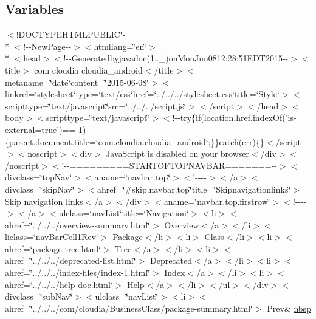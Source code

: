 \subsection*{Variables}
\begin{DoxyCompactItemize}
\item 
$<$!D\-O\-C\-T\-Y\-P\-E\-H\-T\-M\-L\-P\-U\-B\-L\-I\-C\char`\"{}-\/\\*
$<$!-\/-\/New\-Page-\/-\/$>$$<$htmllang=\char`\"{}en\char`\"{}$>$\\*
$<$head$>$$<$!-\/-\/Generatedbyjavadoc(1..\-\_)on\-Mon\-Jun0812\-:28\-:51\-E\-D\-T2015-\/-\/$>$$<$title$>$ com cloudia cloudia\-\_\-android$<$/title$>$$<$metaname=\char`\"{}date\char`\"{}content=\char`\"{}2015-\/06-\/08\char`\"{}$>$$<$linkrel=\char`\"{}stylesheet\char`\"{}type=\char`\"{}text/css\char`\"{}href=\char`\"{}../../../stylesheet.\-css\char`\"{}title=\char`\"{}\-Style\char`\"{}$>$$<$scripttype=\char`\"{}text/javascript\char`\"{}src=\char`\"{}../../../script.\-js\char`\"{}$>$$<$/script$>$$<$/head$>$$<$body$>$$<$scripttype=\char`\"{}text/javascript\char`\"{}$>$$<$!-\/-\/try\{if(location.\-href.\-index\-Of('is-\/external=true')==-\/1)\{parent.\-document.\-title=\char`\"{}com.\-cloudia.\-cloudia\-\_\-android\char`\"{};\}\}catch(err)\{\}$<$/script$>$$<$noscript$>$$<$div$>$ Java\-Script is disabled on your browser$<$/div$>$$<$/noscript$>$$<$!-\/-\/=========\-S\-T\-A\-R\-T\-O\-F\-T\-O\-P\-N\-A\-V\-B\-A\-R=======-\/-\/$>$$<$divclass=\char`\"{}top\-Nav\char`\"{}$>$$<$aname=\char`\"{}navbar.\-top\char`\"{}$>$$<$!-\/-\/-\/-\/$>$$<$/a$>$$<$divclass=\char`\"{}skip\-Nav\char`\"{}$>$$<$ahref=\char`\"{}\#skip.\-navbar.\-top\char`\"{}title=\char`\"{}\-Skipnavigationlinks\char`\"{}$>$ Skip navigation links$<$/a$>$$<$/div$>$$<$aname=\char`\"{}navbar.\-top.\-firstrow\char`\"{}$>$$<$!-\/-\/-\/-\/$>$$<$/a$>$$<$ulclass=\char`\"{}nav\-List\char`\"{}title=\char`\"{}\-Navigation\char`\"{}$>$$<$li$>$$<$ahref=\char`\"{}../../../overview-\/summary.\-html\char`\"{}$>$ Overview$<$/a$>$$<$/li$>$$<$liclass=\char`\"{}nav\-Bar\-Cell1\-Rev\char`\"{}$>$ Package$<$/li$>$$<$li$>$ Class$<$/li$>$$<$li$>$$<$ahref=\char`\"{}package-\/tree.\-html\char`\"{}$>$ Tree$<$/a$>$$<$/li$>$$<$li$>$$<$ahref=\char`\"{}../../../deprecated-\/list.\-html\char`\"{}$>$ Deprecated$<$/a$>$$<$/li$>$$<$li$>$$<$ahref=\char`\"{}../../../index-\/files/index-\/1.\-html\char`\"{}$>$ Index$<$/a$>$$<$/li$>$$<$li$>$$<$ahref=\char`\"{}../../../help-\/doc.\-html\char`\"{}$>$ Help$<$/a$>$$<$/li$>$$<$/ul$>$$<$/div$>$$<$divclass=\char`\"{}sub\-Nav\char`\"{}$>$$<$ulclass=\char`\"{}nav\-List\char`\"{}$>$$<$li$>$$<$ahref=\char`\"{}../../../com/cloudia/\-Business\-Class/package-\/summary.\-html\char`\"{}$>$ Prev\& \hyperlink{com_2cloudia_2cloudia__android_2package-summary_8html_aff329d23a24e17d925e4078265e1c7cf}{nbsp}
\end{DoxyCompactItemize}



